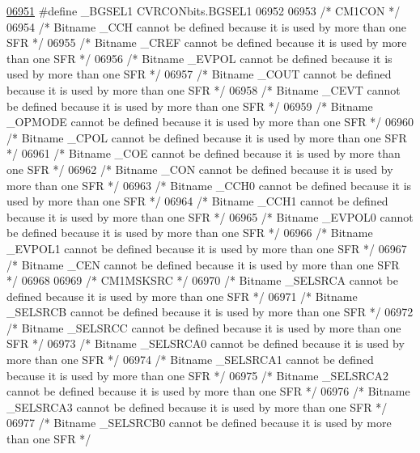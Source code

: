 \begin{DoxyCode}
\hypertarget{a00015_source_l06951}{}\hyperlink{a00015_abf9cf652cf226e2d6c834750932b9117}{06951} \textcolor{preprocessor}{#define \_BGSEL1 CVRCONbits.BGSEL1}
06952 
06953 \textcolor{comment}{/* CM1CON */}
06954 \textcolor{comment}{/* Bitname \_CCH cannot be defined because it is used by more than one SFR */}
06955 \textcolor{comment}{/* Bitname \_CREF cannot be defined because it is used by more than one SFR */}
06956 \textcolor{comment}{/* Bitname \_EVPOL cannot be defined because it is used by more than one SFR */}
06957 \textcolor{comment}{/* Bitname \_COUT cannot be defined because it is used by more than one SFR */}
06958 \textcolor{comment}{/* Bitname \_CEVT cannot be defined because it is used by more than one SFR */}
06959 \textcolor{comment}{/* Bitname \_OPMODE cannot be defined because it is used by more than one SFR */}
06960 \textcolor{comment}{/* Bitname \_CPOL cannot be defined because it is used by more than one SFR */}
06961 \textcolor{comment}{/* Bitname \_COE cannot be defined because it is used by more than one SFR */}
06962 \textcolor{comment}{/* Bitname \_CON cannot be defined because it is used by more than one SFR */}
06963 \textcolor{comment}{/* Bitname \_CCH0 cannot be defined because it is used by more than one SFR */}
06964 \textcolor{comment}{/* Bitname \_CCH1 cannot be defined because it is used by more than one SFR */}
06965 \textcolor{comment}{/* Bitname \_EVPOL0 cannot be defined because it is used by more than one SFR */}
06966 \textcolor{comment}{/* Bitname \_EVPOL1 cannot be defined because it is used by more than one SFR */}
06967 \textcolor{comment}{/* Bitname \_CEN cannot be defined because it is used by more than one SFR */}
06968 
06969 \textcolor{comment}{/* CM1MSKSRC */}
06970 \textcolor{comment}{/* Bitname \_SELSRCA cannot be defined because it is used by more than one SFR */}
06971 \textcolor{comment}{/* Bitname \_SELSRCB cannot be defined because it is used by more than one SFR */}
06972 \textcolor{comment}{/* Bitname \_SELSRCC cannot be defined because it is used by more than one SFR */}
06973 \textcolor{comment}{/* Bitname \_SELSRCA0 cannot be defined because it is used by more than one SFR */}
06974 \textcolor{comment}{/* Bitname \_SELSRCA1 cannot be defined because it is used by more than one SFR */}
06975 \textcolor{comment}{/* Bitname \_SELSRCA2 cannot be defined because it is used by more than one SFR */}
06976 \textcolor{comment}{/* Bitname \_SELSRCA3 cannot be defined because it is used by more than one SFR */}
06977 \textcolor{comment}{/* Bitname \_SELSRCB0 cannot be defined because it is used by more than one SFR */}

\end{DoxyCode}
